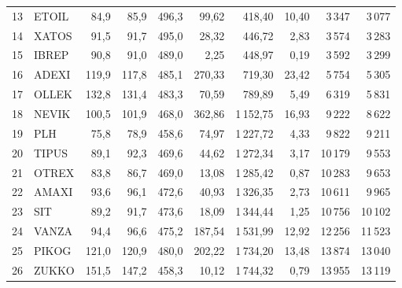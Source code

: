 \begin{longtable}{rlrrrrrrrr}
13 & ETOIL & 84,9 & 85,9 & 496,3 & 99,62 & 418,40 & 10,40 & 3\,347 & 3\,077\\
14 & XATOS & 91,5 & 91,7 & 495,0 & 28,32 & 446,72 & 2,83 & 3\,574 & 3\,283\\
15 & IBREP & 90,8 & 91,0 & 489,0 & 2,25 & 448,97 & 0,19 & 3\,592 & 3\,299\\
16 & ADEXI & 119,9 & 117,8 & 485,1 & 270,33 & 719,30 & 23,42 & 5\,754 & 5\,305\\
17 & OLLEK & 132,8 & 131,4 & 483,3 & 70,59 & 789,89 & 5,49 & 6\,319 & 5\,831\\
18 & NEVIK & 100,5 & 101,9 & 468,0 & 362,86 & 1\,152,75 & 16,93 & 9\,222 & 8\,622\\
19 & PLH & 75,8 & 78,9 & 458,6 & 74,97 & 1\,227,72 & 4,33 & 9\,822 & 9\,211\\
20 & TIPUS & 89,1 & 92,3 & 469,6 & 44,62 & 1\,272,34 & 3,17 & 10\,179 & 9\,553\\
21 & OTREX & 83,8 & 86,7 & 469,0 & 13,08 & 1\,285,42 & 0,87 & 10\,283 & 9\,653\\
22 & AMAXI & 93,6 & 96,1 & 472,6 & 40,93 & 1\,326,35 & 2,73 & 10\,611 & 9\,965\\
23 & SIT & 89,2 & 91,7 & 473,6 & 18,09 & 1\,344,44 & 1,25 & 10\,756 & 10\,102\\
24 & VANZA & 94,4 & 96,6 & 475,2 & 187,54 & 1\,531,99 & 12,92 & 12\,256 & 11\,523\\
25 & PIKOG & 121,0 & 120,9 & 480,0 & 202,22 & 1\,734,20 & 13,48 & 13\,874 & 13\,040\\
26 & ZUKKO & 151,5 & 147,2 & 458,3 & 10,12 & 1\,744,32 & 0,79 & 13\,955 & 13\,119\\
\end{longtable}
\endgroup
